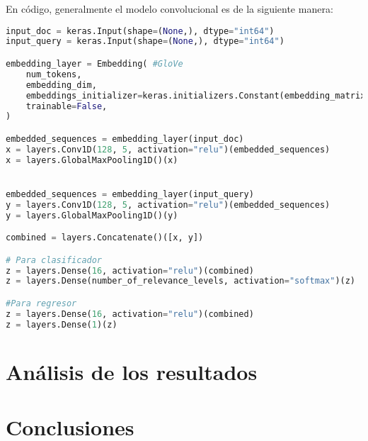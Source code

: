 \documentclass[12pt]{article}
\begin{document}
En c\'odigo, generalmente el modelo convolucional es de la siguiente manera:
	 \begin{lstlisting}[frame=single, breaklines, language=Python] 
input_doc = keras.Input(shape=(None,), dtype="int64")
input_query = keras.Input(shape=(None,), dtype="int64")

embedding_layer = Embedding( #GloVe
	num_tokens,
	embedding_dim,
	embeddings_initializer=keras.initializers.Constant(embedding_matrix),
	trainable=False,
)

embedded_sequences = embedding_layer(input_doc)
x = layers.Conv1D(128, 5, activation="relu")(embedded_sequences)
x = layers.GlobalMaxPooling1D()(x)


embedded_sequences = embedding_layer(input_query)
y = layers.Conv1D(128, 5, activation="relu")(embedded_sequences)
y = layers.GlobalMaxPooling1D()(y)

combined = layers.Concatenate()([x, y])

# Para clasificador
z = layers.Dense(16, activation="relu")(combined)
z = layers.Dense(number_of_relevance_levels, activation="softmax")(z)

#Para regresor
z = layers.Dense(16, activation="relu")(combined)
z = layers.Dense(1)(z) 

\end{lstlisting}



\section{Análisis de los resultados} 


\section{Conclusiones} %




% 

\end{document}
